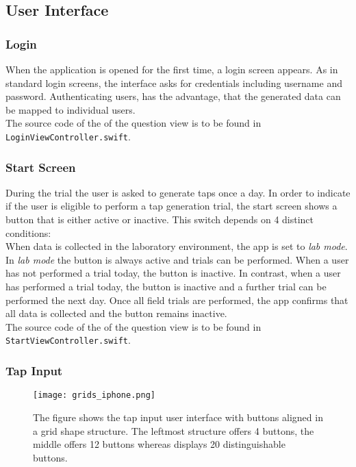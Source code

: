 \subsection{User Interface}
\subsubsection{Login}
When the application is opened for the first time, a login screen appears. As in standard login screens, the interface asks for credentials including username and password. Authenticating users, has the advantage, that the generated data can be mapped to individual users.\\

The source code of the of the question view is to be found in \texttt{LoginViewController.swift}.

\subsubsection{Start Screen}
During the trial the user is asked to generate taps once a day. In order to indicate if the user is eligible to perform a tap generation trial, the start screen shows a button that is either active or inactive. This switch depends on 4 distinct conditions: \\

When data is collected in the laboratory environment, the app is set to \textit{lab mode}. In \textit{lab mode} the button is always active and trials can be performed. When a user has not performed a trial today, the button is inactive. In contrast, when a user has performed a trial today, the button is inactive and a further trial can be performed the next day. Once all field trials are performed, the app confirms that all data is collected and the button remains inactive.\\

The source code of the of the question view is to be found in \texttt{StartViewController.swift}.
\subsubsection{Tap Input}

\begin{figure}[h!]
  \centering
  \texttt{[image: grids\_iphone.png]}
  \caption{The figure shows the tap input user interface with buttons aligned in a grid shape structure. The leftmost structure offers 4 buttons, the middle offers 12 buttons whereas displays 20 distinguishable buttons.}\label{fig:grid}
\end{figure}


